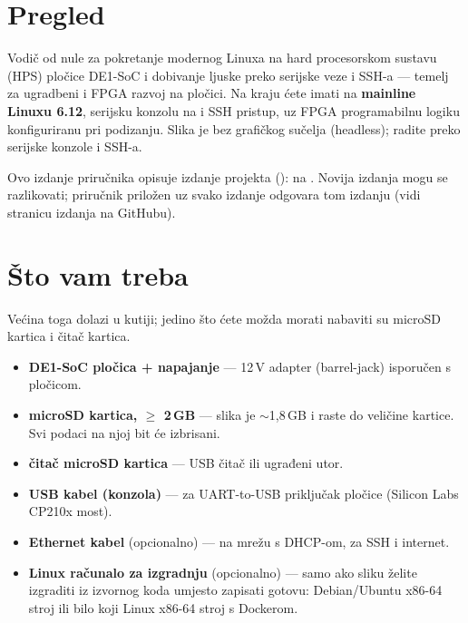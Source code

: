 \section*{Pregled}
Vodič od nule za pokretanje modernog Linuxa na hard procesorskom sustavu (HPS)
pločice DE1-SoC i dobivanje ljuske preko serijske veze i SSH-a --- temelj za
ugradbeni i FPGA razvoj na pločici. Na kraju ćete imati \textbf{\ManualOS}
na \textbf{mainline Linuxu 6.12}, serijsku konzolu na
 i SSH pristup, uz FPGA programabilnu logiku konfiguriranu pri podizanju.
Slika je bez grafičkog sučelja (headless); radite preko serijske konzole i SSH-a.

\begin{note}
Ovo izdanje priručnika opisuje izdanje projekta \textbf{\ManualRelease}
(\ManualReleaseDate): \ManualOS{} na \ManualKernel. Novija izdanja mogu se
razlikovati; priručnik priložen uz svako izdanje odgovara tom izdanju (vidi
stranicu izdanja na GitHubu).
\end{note}

\section{Što vam treba}
Većina toga dolazi u kutiji; jedino što ćete možda morati nabaviti su microSD
kartica i čitač kartica.
\begin{itemize}
  \item \textbf{DE1-SoC pločica + napajanje} --- 12\,V adapter (barrel-jack) isporučen s pločicom.
  \item \textbf{microSD kartica, $\geq$ 2\,GB} --- slika je $\sim$1,8\,GB i raste do veličine kartice. Svi podaci na njoj bit će izbrisani.
  \item \textbf{čitač microSD kartica} --- USB čitač ili ugrađeni utor.
  \item \textbf{USB kabel (konzola)} --- za UART-to-USB priključak pločice (Silicon Labs CP210x most).
  \item \textbf{Ethernet kabel} (opcionalno) --- na mrežu s DHCP-om, za SSH i internet.
  \item \textbf{Linux računalo za izgradnju} (opcionalno) --- samo ako sliku želite izgraditi iz izvornog koda umjesto zapisati gotovu: Debian/Ubuntu x86-64 stroj ili bilo koji Linux x86-64 stroj s Dockerom.
\end{itemize}

